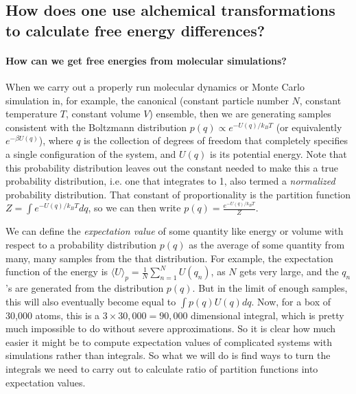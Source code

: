 \documentclass[9pt,bestpractices]{livecoms}
\begin{document}
\subsection{How does one use alchemical transformations to calculate free energy differences?}
\label{subsec:numerical-implementations}
\paragraph{How can we get free energies from molecular simulations?}

When we carry out a properly run molecular dynamics or Monte Carlo
simulation in, for example, the canonical (constant particle number
$N$, constant temperature $T$, constant volume $V$) ensemble, then we
are generating samples consistent with the Boltzmann distribution
$p(q) \propto e^{-U(q)/k_BT}$ (or equivalently $e^{-\beta U(q)}$), where $q$ is the
collection of degrees of freedom that completely specifies a single configuration
of the system, and $U(q)$ is its potential energy.
Note that this probability distribution leaves out the constant
needed to make this a true probability distribution, i.e. one that
integrates to 1, also termed a \textit{normalized} probability
distribution.  That constant of proportionality is the partition
function $Z=\int e^{-U(q)/k_BT} dq$, so we can then write
$p(q) = \frac{e^{-U(q)/k_BT}}{Z}$.

We can define the \textit{expectation value} of some quantity like
energy or volume with respect to a probability distribution $p(q)$ as
the average of some quantity from many, many samples from the that
distribution. For example, the expectation function of the energy is
$\langle U \rangle_p = \frac{1}{N}\sum_{n=1}^N U(q_n)$, as $N$ gets
very large, and the $q_n$'s are generated from the distribution
$p(q)$. But in the limit of enough samples, this will also eventually
become equal to $\int p(q) U(q)dq$.  Now, for a box
of 30,000 atoms, this is a $3\times30,000 = 90,000$ dimensional
integral, which is pretty much impossible to do without severe
approximations. So it is clear how much easier it might be to compute
expectation values of complicated systems with simulations rather than
integrals.  So what we will do is find ways to turn the integrals we
need to carry out to calculate ratio of partition functions into
expectation values.

\end{document}
